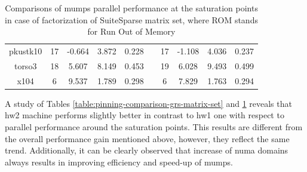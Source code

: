 \begin{table}[htpb]
\begin{tabular}{c|c|c|c|c|c|c|c|c|c|}
\multicolumn{1}{|c|}{pkustk10}                                              & 17  & -0.664                                                                & 3.872                                              & 0.228                                                  &  & 17  & -1.108                                                                & 4.036                                              & 0.237                                                  \\ \cline{1-5} \cline{7-10} 
\multicolumn{1}{|c|}{torso3}                                                & 18  & 5.607                                                                 & 8.149                                              & 0.453                                                  &  & 19  & 6.028                                                                 & 9.493                                              & 0.499                                                  \\ \cline{1-5} \cline{7-10} 
\multicolumn{1}{|c|}{x104}                                                  & 6   & 9.537                                                                 & 1.789                                              & 0.298                                                  &  & 6   & 7.829                                                                 & 1.763                                              & 0.294                                                  \\ \cline{1-5} \cline{7-10} 
\end{tabular}
\caption[Comparisons of \acrshort{mumps} parallel performance at the saturation points in case of factorization of SuiteSparse matrix set]{Comparisons of \acrshort{mumps} parallel performance at the saturation points in case of factorization of SuiteSparse matrix set, where ROM stands for Run Out of Memory}
\label{table:pinning-comparison-suitesparse-matrix-set}
\end{table}


A study of Tables \ref{table:pinning-comparison-grs-matrix-set} and \ref{table:pinning-comparison-suitesparse-matrix-set} reveals that \gls{hw2} machine performs slightly better in contrast to \gls{hw1} one with respect to parallel performance around the saturation points. This results are different from the overall performance gain mentioned above, however, they reflect the same trend. Additionally, it can be clearly observed that increase of \acrshort{numa} domains always results in improving efficiency and speed-up of \acrshort{mumps}.\\

